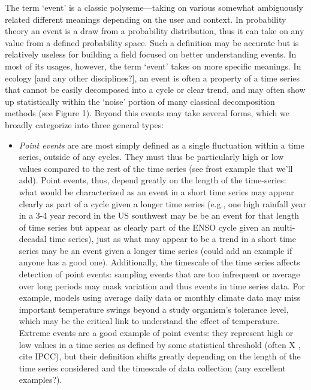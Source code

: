 \documentclass[11pt,a4paper,oneside]{article}
\begin{document}
The term `event' is a classic polyseme---taking on various somewhat ambiguously related different meanings depending on the user and context. In probability theory an event is a draw from a probability distribution, thus it can take on any value from a defined probability space. Such a definition may be accurate but is relatively useless for building a field focused on better understanding events. In most of its usages, however, the term `event' takes on more specific meanings. In ecology [and any other disciplines?], an event is often a property of a time series that cannot be easily decomposed into a cycle or clear trend, and may often show up statistically within the `noise' portion of many classical decomposition methods (see Figure 1). Beyond this events may take several forms, which we broadly categorize into three general types:
\begin{itemize}
\item \emph{Point events} are are most simply defined as a single fluctuation within a time series, outside of any cycles. They must thus be particularly high or low values compared to the rest of the time series (see frost example that we'll add). Point events, thus, depend greatly on the length of the time-series: what would be characterized as an event in a short time series may appear clearly as part of a cycle given a longer time series (e.g., one high rainfall year in a 3-4 year record in the US southwest may be be an event for that length of time series but appear as clearly part of the ENSO cycle given an multi-decadal time series), just as what may appear to be a trend in a short time series may be an event given a longer time series (could add an example if anyone has a good one). Additionally, the timescale of the time series affects detection of point events: sampling events that are too infrequent or average over long periods may mask variation and thus events in time series data. For example, models using average daily data or monthly climate data may miss important temperature swings beyond a study organism's tolerance level, which may be the critical link to understand the effect of temperature. Extreme events are a good example of point events: they represent high or low values in a time series as defined by some statistical threshold (often X , cite IPCC), but their definition shifts greatly depending on the length of the time series considered and the timescale of data collection (any excellent examples?). 

\end{itemize}
\end{document}
